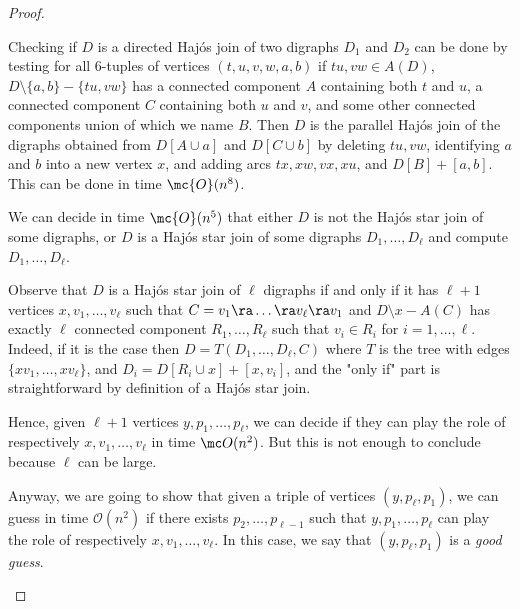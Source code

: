 \begin{proof}
    \begin{proofclaim}
        Checking if $D$ is a directed Haj\'os join of two digraphs $D_1$ and $D_2$ can be done by testing for all $6$-tuples of vertices $(t, u, v, w, a, b)$ if $tu, vw \in A(D)$, $D \setminus \{a,b\} - \{tu, vw\}$ has a connected component $A$ containing both $t$ and $u$, a connected component $C$ containing both $u$ and $v$, and some other connected components union of which we name $B$. Then $D$ is the parallel Haj\'os join of  the digraphs obtained from $D[A \cup a]$ and $D[C \cup b]$ by deleting $tu, vw$, identifying $a$ and $b$ into a new vertex $x$, and adding arcs $tx,xw,vx,xu$, and $D[B] + [a,b]$.         
        This can be done in time $\mc{O}(n^8)$.
    
    \end{proofclaim}

    
    \begin{claim}\label{clm:alg_HSJ}
        We can decide in time $\mc{O}(n^5)$ that either $D$ is not the Haj\'os star join of some digraphs, or $D$ is a Haj\'os star join of some digraphs  $D_1, \dots, D_{\ell}$ and compute $D_1, \dots, D_{\ell}$. 
    \end{claim}
    
    \begin{proofclaim}
        Observe that $D$ is a Haj\'os star join of $\ell$ digraphs if and only if it has $\ell +1$ vertices $x, v_1, \dots, v_{\ell}$ such that $C= v_1 \ra \dots \ra v_{\ell} \ra v_1$ and $D\setminus x -A(C)$ has exactly $\ell$ connected component $R_1, \dots, R_{\ell}$ such that $v_i \in R_i$ for $i=1, \dots, \ell$.  
        Indeed, if it is the case then $D=T(D_1, \dots, D_{\ell}, C)$ where $T$ is the tree with edges $\{xv_1, \dots, xv_{\ell}\}$,  and $D_i = D[R_i \cup x] + [x,v_i]$, and the "only if" part is straightforward by definition of a Haj\'os star join.  
        
        Hence, given $\ell+1$ vertices $y, p_1, \dots, p_{\ell}$, we can decide if they can play the role of respectively $x, v_1, \dots, v_{\ell}$ in time $\mc O(n^2)$. 
        But this is not enough to conclude because  $\ell$ can be large. 

        Anyway, we are going to show that given a triple of vertices $(y,p_{\ell}, p_1)$, we can guess in time $\mathcal O(n^2)$ if there exists $p_2, \dots, p_{\ell-1}$ such that $y, p_1, \dots, p_{\ell}$ can play the role of respectively $x, v_1, \dots, v_{\ell}$. In this case, we say that $(y, p_{\ell}, p_1)$ is a \emph{good guess}. 


\end{proofclaim}
\end{proof}
